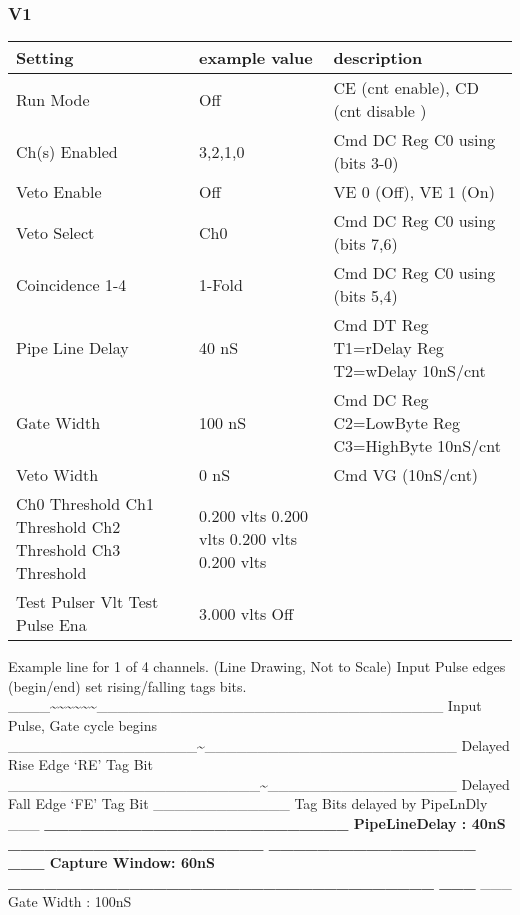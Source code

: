 \documentclass[letterpaper,10pt,english]{sphinxmanual}
\begin{document}
\subsubsection{V1}
\label{hardware:v1}
\begin{tabulary}{\linewidth}{|L|L|L|}
\hline
\textbf{
Setting
} & \textbf{
example value
} & \textbf{
description
}\\\hline

Run Mode
 & 
Off
 & 
CE (cnt enable), CD (cnt disable )
\\\hline

Ch(s) Enabled
 & 
3,2,1,0
 & 
Cmd DC  Reg C0 using (bits 3-0)
\\\hline

Veto Enable
 & 
Off
 & 
VE 0 (Off),  VE 1 (On)
\\\hline

Veto Select
 & 
Ch0
 & 
Cmd DC  Reg C0 using (bits 7,6)
\\\hline

Coincidence 1-4
 & 
1-Fold
 & 
Cmd DC  Reg C0 using (bits 5,4)
\\\hline

Pipe Line Delay
 & 
40 nS
 & 
Cmd DT  Reg T1=rDelay  Reg T2=wDelay  10nS/cnt
\\\hline

Gate Width
 & 
100 nS
 & 
Cmd DC  Reg C2=LowByte Reg C3=HighByte 10nS/cnt
\\\hline

Veto Width
 & 
0 nS
 & 
Cmd VG  (10nS/cnt)
\\\hline

Ch0 Threshold
Ch1 Threshold
Ch2 Threshold
Ch3 Threshold
 & 
0.200 vlts
0.200 vlts
0.200 vlts
0.200 vlts
 & \\\hline

Test Pulser Vlt
Test Pulse Ena
 & 
3.000 vlts
Off
 & \\\hline
\end{tabulary}


Example line for 1 of 4 channels. (Line Drawing, Not to Scale)
Input Pulse edges (begin/end) set rising/falling tags bits.
\_\_\_\_\textasciitilde{}\textasciitilde{}\textasciitilde{}\textasciitilde{}\textasciitilde{}\textasciitilde{}\_\_\_\_\_\_\_\_\_\_\_\_\_\_\_\_\_\_\_\_\_\_\_\_\_\_\_\_\_\_\_\_\_ Input Pulse, Gate cycle begins
\_\_\_\_\_\_\_\_\_\_\_\_\_\_\_\_\_\_\textasciitilde{}\_\_\_\_\_\_\_\_\_\_\_\_\_\_\_\_\_\_\_\_\_\_\_\_ Delayed Rise Edge `RE' Tag Bit
\_\_\_\_\_\_\_\_\_\_\_\_\_\_\_\_\_\_\_\_\_\_\_\_\textasciitilde{}\_\_\_\_\_\_\_\_\_\_\_\_\_\_\_\_\_\_ Delayed Fall Edge `FE' Tag Bit
\_\_\_\_\_\_\_\_\_\_\_\_\_                           Tag Bits delayed by PipeLnDly
\_\_\_\textbar{}        {\color{red}\bfseries{}\textbar{}\_\_\_\_\_\_\_\_\_\_\_\_\_\_\_\_\_\_\_\_\_\_\_\_\_ PipeLineDelay :   40nS
\_\_\_\_\_\_\_\_\_\_\_\_\_\_\_\_\_\_\_\_\_
\_\_\_\_\_\_\_\_\_\_\_\_\_\_\_\_\_\textbar{}}                     {\color{red}\bfseries{}\textbar{}\_\_\_ Capture Window:   60nS
\_\_\_\_\_\_\_\_\_\_\_\_\_\_\_\_\_\_\_\_\_\_\_\_\_\_\_\_\_\_\_\_\_\_\_
\_\_\_\textbar{}}                                   {\color{red}\bfseries{}\textbar{}}\_\_\_ Gate Width    :  100nS
\end{document}
